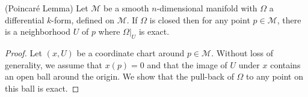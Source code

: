 \begin{theorem} \label{theorem:2.4}
(Poincar\'e Lemma) Let $\mathcal M$ be a smooth $n$-dimensional manifold with $\Omega$ a differential $k$-form, defined on $\mathcal M$. If $\Omega$ is closed then for any point $p\in \mathcal M$, there is a neighborhood $U$ of $p$ where $\Omega|_{U}$ is exact.
\end{theorem}

\begin{proof}
 Let $(x,U)$ be a coordinate chart around $p\in \mathcal M$. Without loss of generality, we assume that $x(p)=0$ and that the image of $U$ under $x$ contains an open ball around the origin. We show that the pull-back of $\Omega$ to any point on this ball is exact.


\end{proof}

